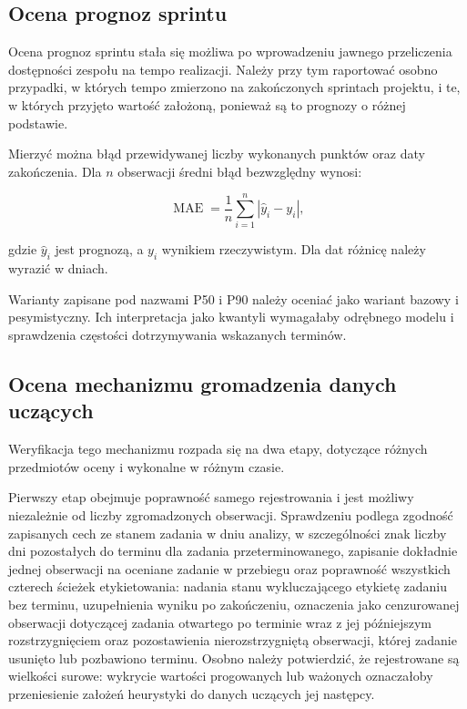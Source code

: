 \subsection{Ocena prognoz sprintu}

Ocena prognoz sprintu stała się możliwa po wprowadzeniu jawnego przeliczenia dostępności zespołu na tempo realizacji. Należy przy tym raportować osobno przypadki, w których tempo zmierzono na zakończonych sprintach projektu, i te, w których przyjęto wartość założoną, ponieważ są to prognozy o różnej podstawie.

Mierzyć można błąd przewidywanej liczby wykonanych punktów oraz daty zakończenia. Dla \(n\) obserwacji średni błąd bezwzględny wynosi:

\begin{equation}
    \operatorname{MAE}
    =
    \frac{1}{n}\sum_{i=1}^{n}
    \left|\hat{y}_i-y_i\right|,
    \label{eq:testy-mae}
\end{equation}

gdzie \(\hat{y}_i\) jest prognozą, a \(y_i\) wynikiem rzeczywistym. Dla dat różnicę należy wyrazić w dniach.

Warianty zapisane pod nazwami P50 i P90 należy oceniać jako wariant bazowy i pesymistyczny. Ich interpretacja jako kwantyli wymagałaby odrębnego modelu i sprawdzenia częstości dotrzymywania wskazanych terminów.

\subsection{Ocena mechanizmu gromadzenia danych uczących}
\label{subsec:ocena-danych-uczacych}

Weryfikacja tego mechanizmu rozpada się na dwa etapy, dotyczące różnych przedmiotów oceny i wykonalne w różnym czasie.

Pierwszy etap obejmuje poprawność samego rejestrowania i jest możliwy niezależnie od liczby zgromadzonych obserwacji. Sprawdzeniu podlega zgodność zapisanych cech ze stanem zadania w dniu analizy, w szczególności znak liczby dni pozostałych do terminu dla zadania przeterminowanego, zapisanie dokładnie jednej obserwacji na oceniane zadanie w przebiegu oraz poprawność wszystkich czterech ścieżek etykietowania: nadania stanu wykluczającego etykietę zadaniu bez terminu, uzupełnienia wyniku po zakończeniu, oznaczenia jako cenzurowanej obserwacji dotyczącej zadania otwartego po terminie wraz z jej późniejszym rozstrzygnięciem oraz pozostawienia nierozstrzygniętą obserwacji, której zadanie usunięto lub pozbawiono terminu. Osobno należy potwierdzić, że rejestrowane są wielkości surowe: wykrycie wartości progowanych lub ważonych oznaczałoby przeniesienie założeń heurystyki do danych uczących jej następcy.

